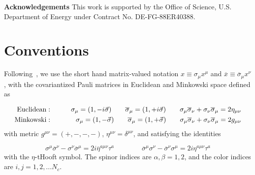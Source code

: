\documentclass[11pt,aps,amsmath,amssymb,nofootinbib,notitlepage,longbibliography]{revtex4-1}
\begin{document}
\vskip 1cm
{\bf Acknowledgements}
This work is supported by the Office of Science, U.S. Department of Energy under Contract No. DE-FG-88ER40388.



\appendix




\section{Conventions}\label{app_defs}







Following~\cite{Balitsky:1993ki,Moch:1996bs,Vandoren:2008xg},
we use the short hand matrix-valued notation
 $x\equiv \sigma_\mu x^\mu$ and $\overline{x}\equiv \overline\sigma_\mu x^\nu$, with
the covariantized Pauli matrices in Euclidean and Minkowski space defined as

\begin{eqnarray} \label{eqn_4dsigma}
{\rm Euclidean}:&&\qquad \sigma_\mu=(1,-i\vec\sigma)\qquad \overline\sigma_\mu=(1, +i\vec\sigma)\qquad
\sigma_\mu\overline\sigma_\nu+\sigma_\nu\overline\sigma_\mu=2\eta_{\mu\nu}\nonumber\\
{\rm Minkowski}:&&\qquad \sigma_\mu=(1,-\vec\sigma)\qquad \overline\sigma_\mu=(1, +\vec\sigma)\qquad
\sigma_\mu\overline\sigma_\nu+\sigma_\nu\overline\sigma_\mu=2g_{\mu\nu}\nonumber
\end{eqnarray}
with metric $g^{\mu\nu}=(+,-,-,-)$, $\eta^{\mu\nu}=\delta^{\mu\nu}$, and satisfying the identities

\begin{equation}
\sigma^\mu\overline{\sigma}^\nu-\sigma^\nu\overline{\sigma}^\mu=2i\overline{\eta}^{a\mu\nu}\tau^a\qquad\qquad
\overline\sigma^\mu{\sigma}^\nu-\overline\sigma^\nu{\sigma}^\mu=2i{\eta}^{a\mu\nu}\tau^a
\end{equation}
with the $\eta$-tHooft symbol.
The spinor indices are $\alpha,\beta=1,2$, and the color indices are  $i,j=1,2, ... N_c$.



\end{document}
